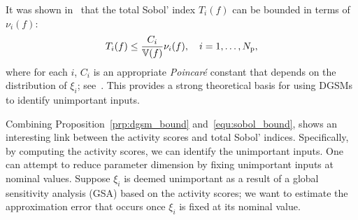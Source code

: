 It was shown in~\cite{Lamboni:2013} that the total Sobol' 
index $T_i(f)$ can be bounded in terms of $\nu_i(f)$:
\begin{equation}\label{equ:sobol_bound}
T_i(f) \leq \frac{C_i}{\mathbb{V}(f)}\nu_i(f), \quad i = 1, \ldots, {N_\text{p}},
\end{equation}
where for each $i$, $C_i$ is an appropriate \emph{Poincar\'{e}} constant
that depends on the distribution of $\xi_i$; see~\cite{Lamboni:2013}.
This provides a strong theoretical basis for using DGSMs to identify 
unimportant inputs. 

Combining Proposition~\ref{prp:dgsm_bound} and~\eqref{equ:sobol_bound}, shows
an interesting link between the activity scores and total Sobol' indices.
Specifically, by computing the activity scores, we can identify the unimportant
inputs.  
One can attempt to reduce parameter dimension by fixing
unimportant inputs at nominal values. Suppose $\xi_i$ is
deemed unimportant as a result of a global sensitivity analysis (GSA)
based on the activity scores; we want to estimate
the approximation error that occurs once $\xi_i$ 
is fixed at its nominal value.


